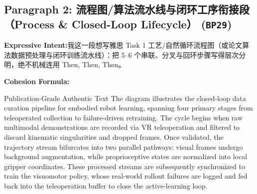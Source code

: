 \subsection*{Paragraph 2: 流程图/算法流水线与闭环工序衔接段（Process \& Closed-Loop Lifecycle） (\texttt{BP29})}
\noindent\textbf{Expressive Intent:}\enspace 我这一段想写雅思 Task 1 工艺/自然循环流程图（或论文算法数据预处理与闭环训练流水线）：把 5--6 个串联、分叉与回环步骤写得层次分明，绝不机械连用 Then, Then, Then。\par
\noindent\textbf{Cohesion Formula:}\par\vspace{4pt}
\begin{ExampleBox}{Publication-Grade Authentic Text}
The diagram illustrates the closed-loop data curation pipeline for embodied robot learning, spanning four primary stages from teleoperated collection to failure-driven retraining. The cycle begins when raw multimodal demonstrations are recorded via VR teleoperation and filtered to discard kinematic singularities and dropped frames. Once validated, the trajectory stream bifurcates into two parallel pathways: visual frames undergo background augmentation, while proprioceptive states are normalized into local gripper coordinates. These processed streams are subsequently synchronized to train the visuomotor policy, whose real-world rollout failures are logged and fed back into the teleoperation buffer to close the active-learning loop.
\end{ExampleBox}
